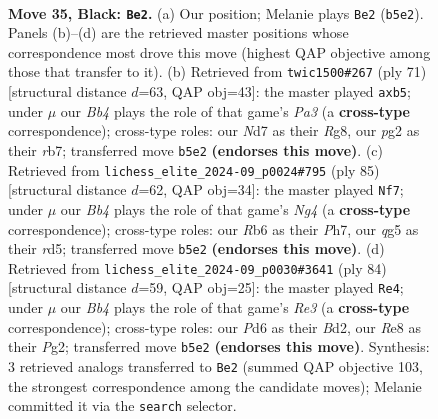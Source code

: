 \documentclass[11pt]{article}
\begin{document}
\clearpage

\begin{figure}[p]\centering
\begin{subfigure}{0.46\textwidth}\centering
\resizebox{\linewidth}{!}{%
\newchessgame
\chessboard[
  setfen={4r3/kp1np3/1r1p4/1b4Q1/3RP3/1PR2P2/6PP/1K6 b - - 0 35},
  showmover=false,
  pgfstyle=straightmove, color=movearrow, markmove={b5-e2}
]}
\caption{}
\end{subfigure}\hfill
\begin{subfigure}{0.46\textwidth}\centering
\resizebox{\linewidth}{!}{%
\newchessgame
\chessboard[
  setfen={6rk/1R3p1p/p3rpb1/1P6/3Q4/1P4PP/5P1K/8 b - - 0 36},
  showmover=false,
  pgfstyle=straightmove, color=movearrow, markmove={a6-b5}
]}
\caption{}
\end{subfigure}
\\[4pt]
\begin{subfigure}{0.46\textwidth}\centering
\resizebox{\linewidth}{!}{%
\newchessgame
\chessboard[
  setfen={6rk/pp5p/4r3/3R2n1/6P1/2P1p2P/PP2R1PK/8 b - - 2 43},
  showmover=false,
  pgfstyle=straightmove, color=movearrow, markmove={g5-f7}
]}
\caption{}
\end{subfigure}\hfill
\begin{subfigure}{0.46\textwidth}\centering
\resizebox{\linewidth}{!}{%
\newchessgame
\chessboard[
  setfen={6k1/1p1r2p1/p6p/P1RP4/8/4R3/1r1BK1PP/8 w - - 1 43},
  showmover=false,
  pgfstyle=straightmove, color=movearrow, markmove={e3-e4}
]}
\caption{}
\end{subfigure}
\caption{\textbf{Move 35, Black: \texttt{Be2}.} (a) Our position; Melanie plays \texttt{Be2} (\texttt{b5e2}). Panels (b)--(d) are the retrieved master positions whose correspondence most drove this move (highest QAP objective among those that transfer to it). (b) Retrieved from \texttt{twic1500\#267} (ply 71) [structural distance $d$=63, QAP obj=43]: the master played \texttt{axb5}; under $\mu$ our \emph{Bb4} plays the role of that game's \emph{Pa3} (a \textbf{cross-type} correspondence); cross-type roles: our \emph{N}d7 as their \emph{R}g8, our \emph{p}g2 as their \emph{r}b7; transferred move \texttt{b5e2} \textbf{(endorses this move)}. (c) Retrieved from \texttt{lichess\_elite\_2024-09\_p0024\#795} (ply 85) [structural distance $d$=62, QAP obj=34]: the master played \texttt{Nf7}; under $\mu$ our \emph{Bb4} plays the role of that game's \emph{Ng4} (a \textbf{cross-type} correspondence); cross-type roles: our \emph{R}b6 as their \emph{P}h7, our \emph{q}g5 as their \emph{r}d5; transferred move \texttt{b5e2} \textbf{(endorses this move)}. (d) Retrieved from \texttt{lichess\_elite\_2024-09\_p0030\#3641} (ply 84) [structural distance $d$=59, QAP obj=25]: the master played \texttt{Re4}; under $\mu$ our \emph{Bb4} plays the role of that game's \emph{Re3} (a \textbf{cross-type} correspondence); cross-type roles: our \emph{P}d6 as their \emph{B}d2, our \emph{R}e8 as their \emph{P}g2; transferred move \texttt{b5e2} \textbf{(endorses this move)}. Synthesis: 3 retrieved analogs transferred to \texttt{Be2} (summed QAP objective 103, the strongest correspondence among the candidate moves); Melanie committed it via the \texttt{search} selector.}
\label{fig:thought-m69}
\end{figure}
\end{document}
